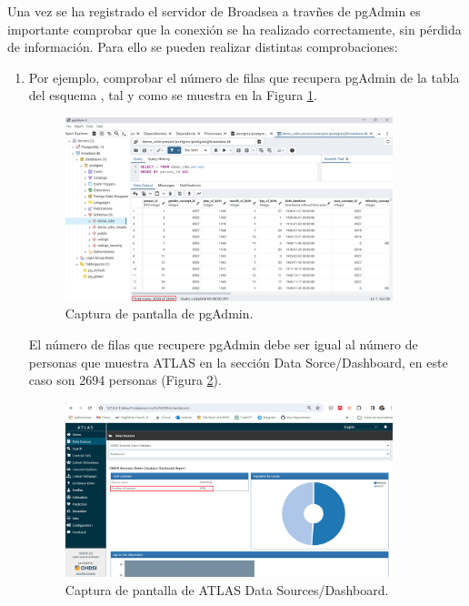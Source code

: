 Una vez se ha registrado el servidor de Broadsea a travñes de pgAdmin es importante comprobar que la conexión se ha realizado correctamente, sin pérdida de información. Para ello se pueden realizar distintas comprobaciones:


\begin{enumerate}

    \item Por ejemplo, comprobar el número de filas que recupera pgAdmin de la tabla  del esquema , tal y como se muestra en la Figura \ref{fig:pgAdmin}.

    \begin{figure}[H]
    \centering
    \includegraphics[width=0.90\textwidth]{figures/pgAdmin.png}
     \caption{Captura de pantalla de pgAdmin.}
    \label{fig:pgAdmin}
    \end{figure}

    El número de filas que recupere pgAdmin debe ser igual al número de personas que muestra ATLAS en la sección Data Sorce/Dashboard, en este caso son 2694 personas (Figura \ref{fig:dashboardEJ}).

    \begin{figure}[H]
    \centering
    \includegraphics[width=0.90\textwidth]{figures/dashboardEJ.png}
     \caption{Captura de pantalla de ATLAS Data Sources/Dashboard.}
    \label{fig:dashboardEJ}
    \end{figure}


\end{enumerate}
